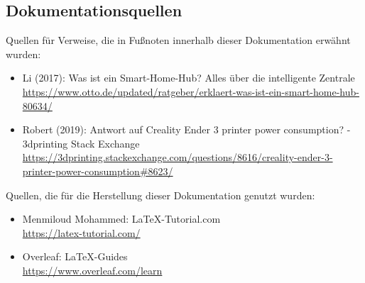 \subsection{Dokumentationsquellen}
Quellen für Verweise, die in Fußnoten innerhalb dieser Dokumentation erwähnt wurden:
\begin{itemize}
 		\item Li (2017): Was ist ein Smart-Home-Hub? Alles über die intelligente Zentrale\\ {\url{https://www.otto.de/updated/ratgeber/erklaert-was-ist-ein-smart-home-hub-80634/}}
 		\item Robert (2019): Antwort auf Creality Ender 3 printer power consumption? - 3dprinting Stack Exchange\\ {\url{https://3dprinting.stackexchange.com/questions/8616/creality-ender-3-printer-power-consumption#8623/}}
\end{itemize}
Quellen, die für die Herstellung dieser Dokumentation genutzt wurden:
\begin{itemize}
	\item Menmiloud Mohammed: \LaTeX -Tutorial.com\\{\url{https://latex-tutorial.com/}}
	\item Overleaf: \LaTeX -Guides\\{\url{https://www.overleaf.com/learn}}
\end{itemize}